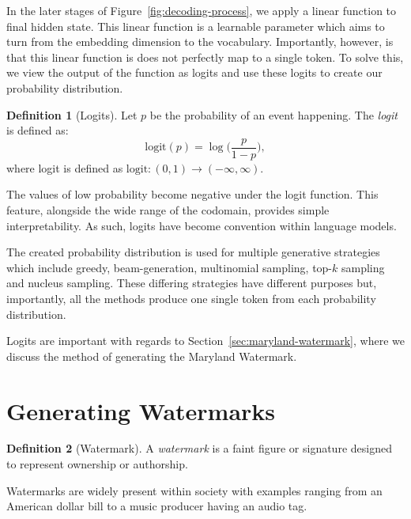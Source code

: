 \documentclass{l4proj}
\theoremstyle{definition}
\newtheorem{definition}{Definition}[section]
\begin{document}
        In the later stages of Figure~\ref{fig:decoding-process}, we apply a linear function to final hidden state. This linear function is a learnable parameter which aims to turn from the embedding dimension to the vocabulary. Importantly, however, is that this linear function is does not perfectly map to a single token. To solve this, we view the output of the function as logits and use these logits to create our probability distribution.
    
        \begin{definition}[Logits]
            Let $p$ be the probability of an event happening. The \emph{logit} is defined as: 
            \begin{equation*}
                \text{logit}(p) = \log\bigg(\frac{p}{1-p}\bigg),
            \end{equation*}
            where logit is defined as $\text{logit}: (0,1) \rightarrow (-\infty, \infty)$.
        \end{definition}
        
        The values of low probability become negative under the logit function. This feature, alongside the wide range of the codomain, provides simple interpretability. As such, logits have become convention within language models.

        The created probability distribution is used for multiple generative strategies which include greedy, beam-generation, multinomial sampling, top-$k$ sampling and nucleus sampling. These differing strategies have different purposes but, importantly, all the methods produce one single token from each probability distribution.

        Logits are important with regards to Section~\ref{sec:maryland-watermark}, where we discuss the method of generating the Maryland Watermark.
    
\section{Generating Watermarks}
    \begin{definition}[Watermark]
        A \emph{watermark} is a faint figure or signature designed to represent ownership or authorship.
    \end{definition}

    Watermarks are widely present within society with examples ranging from an American dollar bill to a music producer having an audio tag. 
\end{document}
